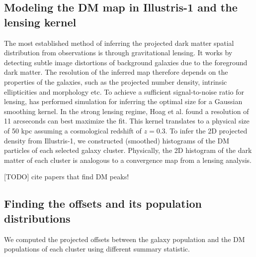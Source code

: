 \subsection{Modeling the DM map in Illustris-1 and the lensing kernel}
The most established method of inferring the projected dark matter spatial 
distribution from observations is through gravitational lensing.
It works by detecting subtle image distortions of background galaxies due to
the foreground dark matter. The resolution of the inferred map therefore 
depends on the properties of the galaxies, such as the projected number density, 
intrinsic ellipticities and morphology etc.
To achieve a sufficient signal-to-noise ratio for lensing, 
\citealt{Hoag2016}  has performed simulation for inferring the optimal size
for a Gaussian smoothing kernel. 
In the strong lensing regime, Hoag et al. found a resolution of 11 arcseconds
can best maximize the fit. This kernel translates to a physical size of 50 
kpc assuming a cosmological redshift of $z = 0.3$.
To infer the 2D projected density from Illustris-1, 
we constructed (smoothed) histograms of the DM
particles of each selected galaxy cluster. 
Physically, the 2D histogram of the dark matter of each cluster 
is analogous to a convergence map from a lensing analysis. 




[TODO] cite papers that find DM peaks!
\subsection{Finding the offsets and its population distributions} 
We computed the projected offsets between the galaxy population and the DM
populations of each cluster using different summary statistic.  


